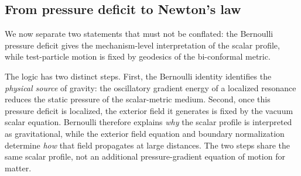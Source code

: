 \documentclass[aps,prd,onecolumn,superscriptaddress,nofootinbib,showpacs,12pt,notitlepage]{revtex4-2}
\begin{document}
\subsection{From pressure deficit to Newton's law}
\label{sec:newton_recovery}

We now separate two statements that must not be conflated:
the Bernoulli pressure deficit gives the mechanism-level
interpretation of the scalar profile, while test-particle
motion is fixed by geodesics of the bi-conformal metric.

The logic has two distinct steps.  First, the Bernoulli
identity identifies the \emph{physical source} of gravity:
the oscillatory gradient energy of a localized resonance
reduces the static pressure of the scalar-metric medium.
Second, once this pressure deficit is localized, the exterior
field it generates is fixed by the vacuum scalar equation.
Bernoulli therefore explains \emph{why} the scalar profile is
interpreted as gravitational, while the exterior field equation
and boundary normalization determine \emph{how} that field
propagates at large distances.  The two steps share the same
scalar profile, not an additional pressure-gradient equation of
motion for matter.
\end{document}
